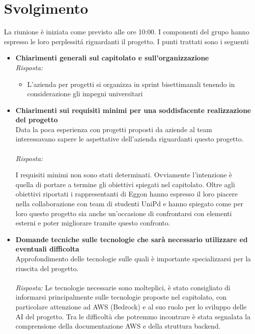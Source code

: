 \documentclass[a4paper,12pt]{article}
\begin{document}
\section{Svolgimento}
    La riunione è iniziata come previsto alle ore 10:00. I componenti del grupo hanno espresso le loro perplessitá riguardanti il progetto. I punti trattati sono i seguenti
    \begin{itemize}
    \item \textbf{Chiarimenti generali sul capitolato e sull'organizzazione}\\
    \noindent
    \textit{Risposta:} \\
    \begin{itemize}
        \item L'azienda per progetti si organizza in sprint bisettimanali tenendo in considerazione gli impegni universitari
    \end{itemize}
    
    \vspace{1em}

    \item \textbf{Chiarimenti sui requisiti minimi per una soddisfacente realizzazione del progetto}\\
    \noindent
    Data la poca esperienza con progetti proposti da aziende al team interessavano sapere le aspettative dell'azienda riguardanti questo progetto. 
    \\ \\
    \textit{Risposta:} 
    
    I requisiti minimi non sono stati determinati. Ovviamente l'intenzione è quella di portare a termine gli obiettivi spiegati nel capitolato. Oltre agli obiettivi riportati i rappresentanti di Eggon hanno espresso il loro piacere nella collaborazione con team di studenti UniPd e hanno spiegato come per loro questo progetto sia anche un'occasione di confrontarsi con elementi esterni e poter migliorare tramite questo confronto.
    
    \vspace{1em}

    \item \textbf{Domande tecniche sulle tecnologie che sarà necessario utilizzare ed eventuali difficolta}\\
    \noindent
    Approfondimento delle tecnologie sulle quali è importante specializzarsi per la riuscita del progetto.\\ \\
    \textit{Risposta:} 
    Le tecnologie necessarie sono molteplici, è stato consigliato di informarsi principalmente sulle tecnologie proposte nel capitolato, con particolare attenzione ad AWS (Bedrock) e al suo ruolo per lo sviluppo delle AI del progetto. Tra le difficoltà che potremmo incontrare è stata segnalata la comprensione della documentazione AWS e della struttura backend.
    \vspace{1em}


\end{itemize}
\end{document}
